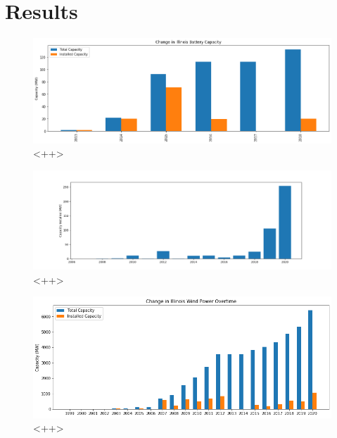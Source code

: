 \section{Results}






\begin{figure}[ht]
	\centering
	\includegraphics[width=\columnwidth]{./img/annual_installed_cap_battery.png}
	\caption{<++>}
	\label{fig:bau}
\end{figure}


\begin{figure}[ht]
	\centering
	\includegraphics[width=\columnwidth]{./img/annual_installed_cap_solar.png}
	\caption{<++>}
	\label{fig:bau}
\end{figure}


\begin{figure}[ht]
	\centering
	\includegraphics[width=\columnwidth]{./img/annual_installed_cap_wind.png}
	\caption{<++>}
	\label{fig:bau}
\end{figure}


